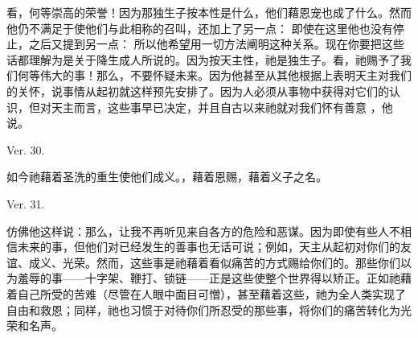  \par

看，何等崇高的荣誉！因为那独生子按本性是什么，他们藉恩宠也成了什么。然而他仍不满足于使他们与此相称的召叫，还加上了另一点： 即使在这里他也没有停止，之后又提到另一点： 所以他希望用一切方法阐明这种关系。现在你要把这些话都理解为是关于降生成人所说的。因为按天主性，祂是独生子。看，祂赐予了我们何等伟大的事！那么，不要怀疑未来。因为他甚至从其他根据上表明天主对我们的关怀，说事情从起初就这样预先安排了。因为人必须从事物中获得对它们的认识，但对天主而言，这些事早已决定，并且自古以来祂就对我们怀有善意 ，他说。\par

Ver. 30. \par

如今祂藉着圣洗的重生使他们成义。，藉着恩赐，藉着义子之名。\par

Ver. 31. \par

仿佛他这样说：那么，让我不再听见来自各方的危险和恶谋。因为即使有些人不相信未来的事，但他们对已经发生的善事也无话可说；例如，天主从起初对你们的友谊、成义、光荣。然而，这些事是祂藉着看似痛苦的方式赐给你们的。那些你们以为羞辱的事——十字架、鞭打、锁链——正是这些使整个世界得以矫正。正如祂藉着自己所受的苦难（尽管在人眼中面目可憎），甚至藉着这些，祂为全人类实现了自由和救恩；同样，祂也习惯于对待你们所忍受的那些事，将你们的痛苦转化为光荣和名声。\par


